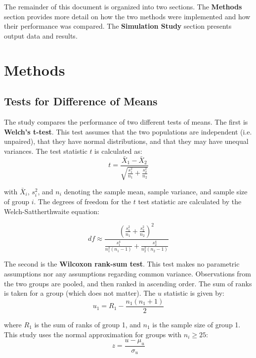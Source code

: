 \documentclass{report}
\begin{document}
The remainder of this document is organized into two sections. The
\textbf{Methods} section provides more detail on how the two methods were
implemented and how their performance was compared. The \textbf{Simulation
Study} section presents output data and results.

\section*{Methods}

\subsection*{Tests for Difference of Means}
The study compares the performance of two different tests of means. The first
is \textbf{Welch's t-test}. This test assumes that the two populations
are independent (i.e. unpaired), that they have normal distributions, and that
they may have unequal variances. The test statistic $t$ is calculated as:
\begin{equation}
t = \frac{\bar{X}_1 - \bar{X}_2}{\sqrt{\frac{s^2_1}{n_1} + \frac{s^2_2}{n_2}}}
\end{equation}

with $\bar{X}_i$, $s^2_i$, and $n_i$ denoting the sample mean, sample variance, and
sample size of group $i$. The degrees of freedom for the $t$ test statistic are
calculated by the Welch-Sattherthwaite equation:

\begin{equation}
df \approx \frac{\left(\frac{s^2_1}{n_1} + \frac{s^2_2}{n_2}
\right)^2}{\frac{s^4_1}{n^2_1(n_1 - 1)} + \frac{s^4_2}{n^2_2(n_2 - 1)}}
\end{equation}

The second is the \textbf{Wilcoxon rank-sum test}. This test makes no parametric
assumptions nor any assumptions regarding common variance. Observations from the
two groups are pooled, and then ranked in ascending order. The sum of ranks is
taken for a group (which does not matter). The $u$ statistic is given by:
\begin{equation}
	u_1 = R_1 - \frac{n_1(n_1 + 1)}{2} 
\end{equation}

where $R_1$ is the sum of ranks of group 1, and $n_1$ is the sample size of
group 1. This study uses the normal approximation for groups with $n_i\geq25$:
\begin{equation}
	z = \frac{u - \mu_u}{\sigma_u}
\end{equation}
\end{document}
